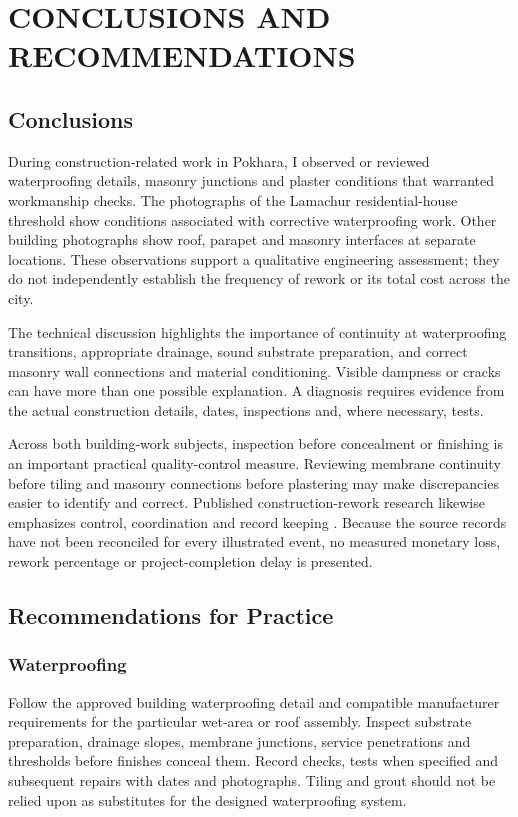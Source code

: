 \chapter{CONCLUSIONS AND RECOMMENDATIONS}
\section{Conclusions}
During construction-related work in Pokhara, I observed or reviewed waterproofing details, masonry junctions and plaster conditions that warranted workmanship checks. The photographs of the Lamachur residential-house threshold show conditions associated with corrective waterproofing work. Other building photographs show roof, parapet and masonry interfaces at separate locations. These observations support a qualitative engineering assessment; they do not independently establish the frequency of rework or its total cost across the city.

The technical discussion highlights the importance of continuity at waterproofing transitions, appropriate drainage, sound substrate preparation, and correct masonry wall connections and material conditioning. Visible dampness or cracks can have more than one possible explanation. A diagnosis requires evidence from the actual construction details, dates, inspections and, where necessary, tests.

Across both building-work subjects, inspection before concealment or finishing is an important practical quality-control measure. Reviewing membrane continuity before tiling and masonry connections before plastering may make discrepancies easier to identify and correct. Published construction-rework research likewise emphasizes control, coordination and record keeping \parencite{forcada2017,safapour2019,love2022}. Because the source records have not been reconciled for every illustrated event, no measured monetary loss, rework percentage or project-completion delay is presented.

\section{Recommendations for Practice}
\subsection{Waterproofing}
Follow the approved building waterproofing detail and compatible manufacturer requirements for the particular wet-area or roof assembly. Inspect substrate preparation, drainage slopes, membrane junctions, service penetrations and thresholds before finishes conceal them. Record checks, tests when specified and subsequent repairs with dates and photographs. Tiling and grout should not be relied upon as substitutes for the designed waterproofing system.


